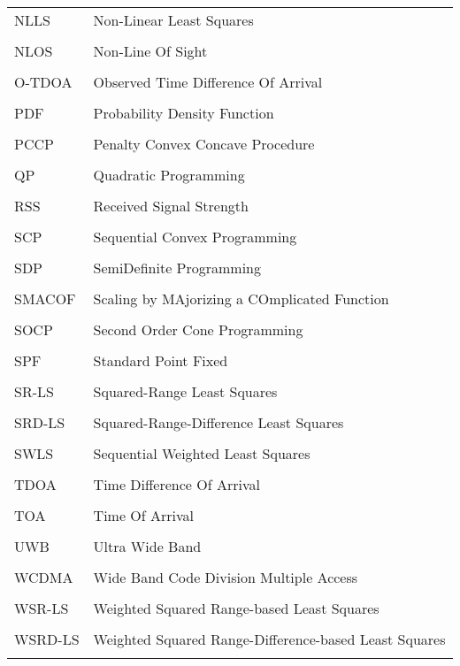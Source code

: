 \begin{longtable}[h]{l l}
\\
NLLS & Non-Linear Least Squares \\
\\
NLOS & Non-Line Of Sight \\
\\
O-TDOA & Observed Time Difference Of Arrival\\
\\
PDF & Probability Density Function \\
\\
PCCP & Penalty Convex Concave Procedure \\
\\
QP & Quadratic Programming \\
\\
RSS & Received Signal Strength \\
\\
SCP & Sequential Convex Programming \\
\\
SDP & SemiDefinite Programming \\
\\
SMACOF & Scaling by MAjorizing a COmplicated Function \\
\\
SOCP & Second Order Cone Programming \\
\\
SPF & Standard  Point Fixed\\
\\
SR-LS  & Squared-Range Least Squares \\
\\
SRD-LS & Squared-Range-Difference Least Squares \\
\\
SWLS & Sequential Weighted Least Squares \\
\\
TDOA &  Time Difference Of Arrival \\
\\
TOA & Time Of Arrival \\
\\
UWB & Ultra Wide Band \\
\\
WCDMA & Wide Band Code Division Multiple Access \\
\\
WSR-LS & Weighted Squared Range-based Least Squares \\
\\
WSRD-LS & Weighted Squared Range-Difference-based Least Squares \\
\\
\end{longtable}
